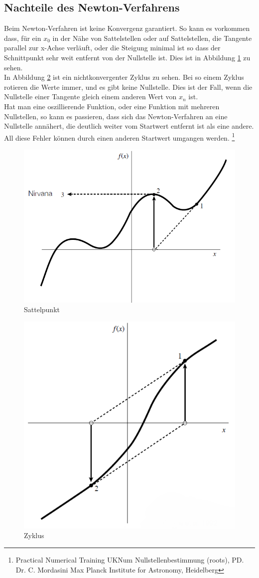 \documentclass[a4paper,12pt,fleqn,oneside]{article}
\begin{document}
	\subsection{Nachteile des Newton-Verfahrens}
		Beim Newton-Verfahren ist keine Konvergenz garantiert. So kann es vorkommen dass, für ein $x_0$ in der Nähe von Sattelstellen oder auf
		Sattelstellen, die Tangente parallel zur x-Achse verläuft, oder die Steigung minimal ist so dass der Schnittpunkt sehr weit entfernt von der
		Nullstelle ist. Dies ist in Abbildung \ref{fig:sattelstelle} zu sehen.\\
		In Abbildung \ref{fig:ring} ist ein nichtkonvergenter Zyklus zu sehen. Bei so einem Zyklus rotieren die Werte immer, und es gibt keine Nullstelle.
		Dies ist der Fall, wenn die Nullstelle einer Tangente gleich einem anderen Wert von $x_n$ ist.\\
		Hat man eine oszillierende  Funktion, oder eine Funktion mit mehreren Nullstellen, so kann es passieren, dass sich das Newton-Verfahren an eine
		Nullstelle annähert, die deutlich weiter vom Startwert entfernt ist als eine andere.\\
		All diese Fehler können durch einen anderen Startwert umgangen werden.
		\footnote{Practical Numerical Training UKNum Nullstellenbestimmung (roots), PD. Dr. C. Mordasini Max Planck Institute for Astronomy, Heidelberg}

		\begin{figure}
			\centering
			\includegraphics[width=0.5\linewidth]{Sattelstelle.png}
			\caption{Sattelpunkt}
			\label{fig:sattelstelle}
		\end{figure}
		
		\begin{figure}
			\centering
			\includegraphics[width=0.5\linewidth]{Ring.png}
			\caption{Zyklus}
			\label{fig:ring}
		\end{figure}
		
\end{document}
